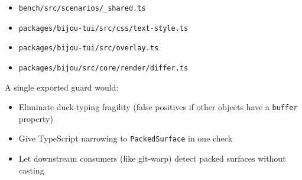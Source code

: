 \begin{itemize}
\tightlist
\item
  \texttt{b\allowbreak{}e\allowbreak{}n\allowbreak{}c\allowbreak{}h\allowbreak{}/\allowbreak{}s\allowbreak{}r\allowbreak{}c\allowbreak{}/\allowbreak{}s\allowbreak{}c\allowbreak{}e\allowbreak{}n\allowbreak{}a\allowbreak{}r\allowbreak{}i\allowbreak{}o\allowbreak{}s\allowbreak{}/\allowbreak{}\_\allowbreak{}s\allowbreak{}h\allowbreak{}a\allowbreak{}r\allowbreak{}e\allowbreak{}d\allowbreak{}.\allowbreak{}t\allowbreak{}s}
\item
  \texttt{p\allowbreak{}a\allowbreak{}c\allowbreak{}k\allowbreak{}a\allowbreak{}g\allowbreak{}e\allowbreak{}s\allowbreak{}/\allowbreak{}b\allowbreak{}i\allowbreak{}j\allowbreak{}o\allowbreak{}u\allowbreak{}-\allowbreak{}t\allowbreak{}u\allowbreak{}i\allowbreak{}/\allowbreak{}s\allowbreak{}r\allowbreak{}c\allowbreak{}/\allowbreak{}c\allowbreak{}s\allowbreak{}s\allowbreak{}/\allowbreak{}t\allowbreak{}e\allowbreak{}x\allowbreak{}t\allowbreak{}-\allowbreak{}s\allowbreak{}t\allowbreak{}y\allowbreak{}l\allowbreak{}e\allowbreak{}.\allowbreak{}t\allowbreak{}s}
\item
  \texttt{p\allowbreak{}a\allowbreak{}c\allowbreak{}k\allowbreak{}a\allowbreak{}g\allowbreak{}e\allowbreak{}s\allowbreak{}/\allowbreak{}b\allowbreak{}i\allowbreak{}j\allowbreak{}o\allowbreak{}u\allowbreak{}-\allowbreak{}t\allowbreak{}u\allowbreak{}i\allowbreak{}/\allowbreak{}s\allowbreak{}r\allowbreak{}c\allowbreak{}/\allowbreak{}o\allowbreak{}v\allowbreak{}e\allowbreak{}r\allowbreak{}l\allowbreak{}a\allowbreak{}y\allowbreak{}.\allowbreak{}t\allowbreak{}s}
\item
  \texttt{p\allowbreak{}a\allowbreak{}c\allowbreak{}k\allowbreak{}a\allowbreak{}g\allowbreak{}e\allowbreak{}s\allowbreak{}/\allowbreak{}b\allowbreak{}i\allowbreak{}j\allowbreak{}o\allowbreak{}u\allowbreak{}/\allowbreak{}s\allowbreak{}r\allowbreak{}c\allowbreak{}/\allowbreak{}c\allowbreak{}o\allowbreak{}r\allowbreak{}e\allowbreak{}/\allowbreak{}r\allowbreak{}e\allowbreak{}n\allowbreak{}d\allowbreak{}e\allowbreak{}r\allowbreak{}/\allowbreak{}d\allowbreak{}i\allowbreak{}f\allowbreak{}f\allowbreak{}e\allowbreak{}r\allowbreak{}.\allowbreak{}t\allowbreak{}s}
\end{itemize}

A single exported guard would:

\begin{itemize}
\tightlist
\item
  Eliminate duck-typing fragility (false positives if other objects have a \texttt{b\allowbreak{}u\allowbreak{}f\allowbreak{}f\allowbreak{}e\allowbreak{}r} property)
\item
  Give TypeScript narrowing to \texttt{P\allowbreak{}a\allowbreak{}c\allowbreak{}k\allowbreak{}e\allowbreak{}d\allowbreak{}S\allowbreak{}u\allowbreak{}r\allowbreak{}f\allowbreak{}a\allowbreak{}c\allowbreak{}e} in one check
\item
  Let downstream consumers (like git-warp) detect packed surfaces without casting
\end{itemize}


